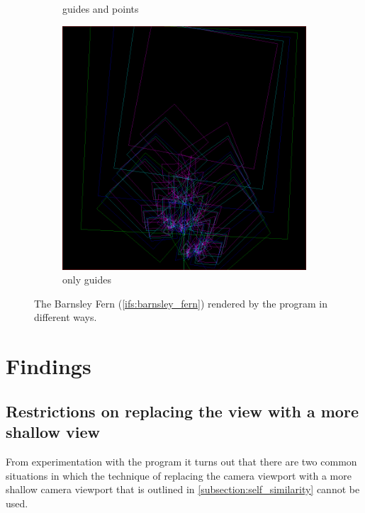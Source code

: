 \documentclass[11pt]{article}
\begin{document}
\begin{figure}
\begin{subfigure}[b]{0.3\textwidth}
         \caption{guides and points}
         \label{figure:barnsley_guides_and_points}
     \end{subfigure}
     \hfill
     \begin{subfigure}[b]{0.3\textwidth}
         \centering
         \includegraphics[width=\textwidth]{figures/barnsley_guides}
         \caption{only guides}
         \label{figure:barnsley_guides}
     \end{subfigure}
        \caption{The Barnsley Fern (\autoref{ifs:barnsley_fern}) rendered by the program in different ways.}
        \label{figure:barnsley_guides_vs_points}
\end{figure}

\section{Findings}
\label{sec:orgc9570dc}
\label{section:findings}

\subsection{Restrictions on replacing the view with a more shallow view}
\label{sec:org66f8907}
\label{subsection:jumping_restrictions}

From experimentation with the program it turns out that there are two common situations
in which the technique of replacing the camera viewport with a more shallow camera viewport that is outlined in \autoref{subsection:self_similarity} cannot be used.
\end{document}
